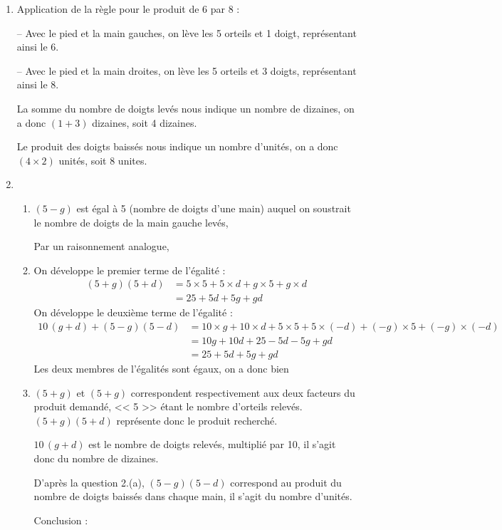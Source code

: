\begin{enumerate}
    \item Application de la règle pour le produit de 6 par 8 : \par
       -- Avec le pied et la main gauches, on lève les 5 orteils et 1 doigt, représentant ainsi le 6. \par
       -- Avec le pied et la main droites, on lève les 5 orteils et 3 doigts, représentant ainsi le 8. \par
       La somme du nombre de doigts levés nous indique un nombre de dizaines, on a donc $(1+3)$ dizaines, soit 4 dizaines. \par
       Le produit des doigts baissés nous indique un nombre d’unités, on a donc $(4\times2)$ unités, soit 8 unites. \par
    \item 
       \begin{enumerate}
          \item $(5-g)$ est égal à 5 (nombre de doigts d'une main) auquel on soustrait le nombre de doigts de la main gauche levés,  \par
             Par un raisonnement analogue,  \par
          \item On développe le premier terme de l'égalité :
             \begin{align*}
                (5+g)(5+d) &=5\times5+5\times d+g\times5 +g\times d \\
                &=25+5d+5g+gd
             \end{align*}
             On développe le deuxième terme de l'égalité :
             \begin{align*}
                10\,(g+d)+(5-g)(5-d) &=10\times g+10\times d+5\times5+5\times(-d)+(-g)\times5+(-g)\times(-d) \\
                &=10g+10d+25-5d-5g+gd \\
                &=25+5d+5g+gd
             \end{align*}
             Les deux membres de l'égalités sont égaux, on a donc bien \par
          \item $(5+g)$ et $(5+g)$ correspondent respectivement aux deux facteurs du produit demandé, << 5 >> étant le nombre d'orteils relevés. $(5+g)(5+d)$ représente donc le produit recherché. \par
             $10\,(g+d)$ est le nombre de doigts relevés, multiplié par 10, il s'agit donc du nombre de dizaines. \par
             D'après la question 2.(a), $(5-g)(5-d)$ correspond au produit du nombre de doigts baissés dans chaque main, il s'agit du nombre d'unités. \par
             Conclusion : 
       \end{enumerate}
 \end{enumerate}
 